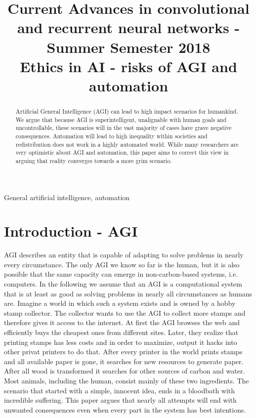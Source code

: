 \documentclass[conference]{IEEEtran}
\begin{document}
\title{
{\large Current Advances in convolutional and recurrent neural networks - Summer Semester 2018} \\
Ethics in AI - risks of AGI and automation
}
\author{
\IEEEauthorblockA{
}
}

\maketitle

\begin{abstract}
Artificial General Intelligence (AGI) can lead to high impact scenarios for humankind. We argue that because AGI is superintelligent, unalignable with human goals and uncontrollable, these scenarios will in the vast majority of cases have grave negative consequences. Automation will lead to high inequality within societies and redistribution does not work in a highly automated world. While many researchers are very optimistic about AGI and automation, this paper aims to correct this view in arguing that reality converges towards a more grim scenario.
\end{abstract}

\begin{IEEEkeywords}
General artificial intelligence, automation
\end{IEEEkeywords}

\section{Introduction - AGI}
%
AGI describes an entity that is capable of adapting to solve problems in nearly every circumstance. The only AGI we know so far is the human, but it is also possible that the same capacity can emerge in non-carbon-based systems, i.e. computers. In the following we assume that an AGI is a computational system that is at least as good as solving problems in nearly all circumstances as humans are. Imagine a world in which such a system exists and is owned by a hobby stamp collector. The collector wants to use the AGI to collect more stamps and therefore gives it access to the internet. At first the AGI browses the web and efficiently buys the cheapest ones from different sites. Later, they realize that printing stamps has less costs and in order to maximize, output it hacks into other privat printers to do that. After every printer in the world prints stamps and all available paper is gone, it searches for new resources to generate paper. After all wood is transformed it searches for other sources of carbon and water. Most animals, including the human, consist mainly of these two ingredients. The scenario that started with a simple, innocent idea, ends in a bloodbath with incredible suffering. This paper argues that nearly all attempts will end with unwanted consequences even when every part in the system has best intentions. 
\end{document}
